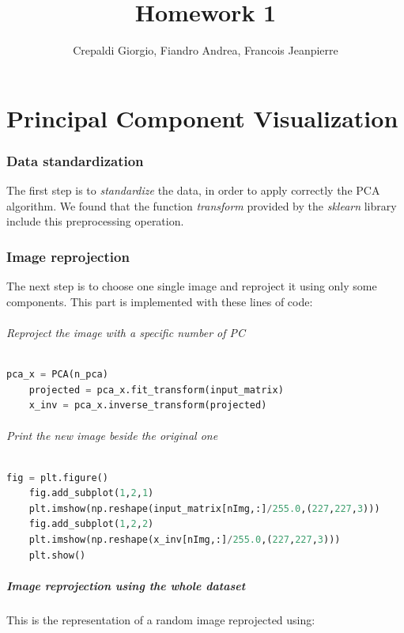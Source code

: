 \documentclass{report}
\title{Homework 1}
\author{Crepaldi Giorgio, Fiandro Andrea, Francois Jeanpierre}
\begin{document}
\maketitle
\tableofcontents

\chapter{Principal Component Visualization}
\subsection{Data standardization}
  The first step is to \textit{standardize} the data, in order to apply correctly the PCA algorithm.
  We found that the function \textit{transform} provided by the \textit{sklearn} library include this preprocessing operation.

\subsection{Image reprojection}

  The next step is to choose one single image and reproject it using only some components.
  This part is implemented with these lines of code:


  \subparagraph{Reproject the image with a specific number of PC}
  \begin{lstlisting}[language=Python]
    pca_x = PCA(n_pca)
    projected = pca_x.fit_transform(input_matrix)
    x_inv = pca_x.inverse_transform(projected)
  \end{lstlisting}

  \subparagraph{Print the new image beside the original one}
  \begin{lstlisting}[language=Python]
    fig = plt.figure()
    fig.add_subplot(1,2,1)
    plt.imshow(np.reshape(input_matrix[nImg,:]/255.0,(227,227,3)))
    fig.add_subplot(1,2,2)
    plt.imshow(np.reshape(x_inv[nImg,:]/255.0,(227,227,3)))
    plt.show()
  \end{lstlisting}

  \pagebreak
  \paragraph{Image reprojection using the whole dataset}
  This is the representation of a random image reprojected using:
\end{document}
